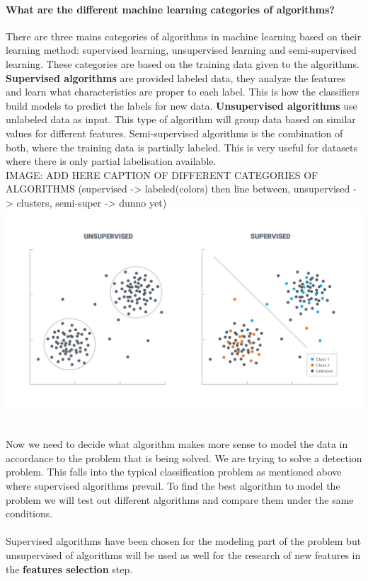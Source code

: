 \paragraph{What are the different machine learning categories of algorithms?}
There are three mains categories of algorithms in machine learning based on their learning method: supervised learning, unsupervised learning and semi-supervised learning.
These categories are based on the training data given to the algorithms. \textbf{Supervised algorithms} are provided labeled data, they analyze the features and learn what characteristics are proper to each label. This is how the classifiers build models to predict the labels for new data.
\textbf{Unsupervised algorithms} use unlabeled data as input. This type of algorithm will group data based on similar values for different features.
Semi-supervised algorithms is the combination of both, where the training data is partially labeled. This is very useful for datasets where there is only partial labelisation available.
\\
IMAGE: ADD HERE CAPTION OF DIFFERENT CATEGORIES OF ALGORITHMS (supervised -> labeled(colors) then line between, unsupervised -> clusters, semi-super -> dunno yet)
\cite{supvsunsup}
\includegraphics[scale=.3]{img/supVsUnsup.png}

\\
Now we need to decide what algorithm makes more sense to model the data in accordance to the problem that is being solved. We are trying to solve a detection problem. This falls into the typical classification problem as mentioned above where supervised algorithms prevail. To find the best algorithm to model the problem we will test out different algorithms and compare them under the same conditions.
\\
\\
Supervised algorithms have been chosen for the modeling part of the problem but unsupervised of algorithms will be used as well for the research of new features in the \textbf{features selection} step.

